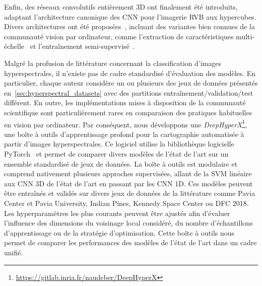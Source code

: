 Enfin, des réseaux convolutifs entièrement 3D ont finalement été introduits, adaptant l'architecture canonique des \gls{CNN} pour l'imagerie \gls{RVB} aux hypercubes. Divers architectures ont été proposées~\cite{li_spectralspatial_2017}, incluant des variantes bien connues de la communauté vision par ordinateur, comme l'extraction de caractéristiques multi-échelle~\cite{he_multi-scale_2017} et l'entraînement semi-supervisé~\cite{liu_semi-supervised_2017}.

Malgré la profusion de littérature concernant la classification d'images hyperspectrales, il n'existe pas de cadre standardisé d'évaluation des modèles. En particulier, chaque auteur considère un ou plusieurs des jeux de données présentés en~\cref{sec:hyperspectral_datasets} avec des partitions entraînement/validation/test différent. En outre, les implémentations mises à disposition de la communauté scientifique sont particulièrement rares en comparaison des pratiques habituelles en vision par ordinateur. Par conséquent, nous développons une \emph{DeepHyperX}\footnote{\url{https://gitlab.inria.fr/naudeber/DeepHyperX}}, une boîte à outils d'apprentissage profond pour la cartographie automatisée à partir d'images hyperspectrales. Ce logiciel utilise la bibliothèque logicielle \gls{PyTorch}~\cite{noauthor_pytorch_2016} et permet de comparer divers modèles de l'état de l'art sur un ensemble standardisé de jeux de données. La boîte à outils est modulaire et comprend nativement plusieurs approches supervisées, allant de la \gls{SVM} linéaire aux \gls{CNN} 3D de l'état de l'art en passant par les \gls{CNN} 1D. Ces modèles peuvent être entraînés et validés sur divers jeux de données de la littérature comme Pavia Center et Pavia University, Indian Pines, Kennedy Space Center ou \gls{DFC} 2018. Les hyperparamètres les plus courants peuvent être ajustés afin d'évaluer l'influence des dimensions du voisinage local considéré, du nombre d'échantillons d'apprentissage ou de la stratégie d'optimisation. Cette boîte à outils nous permet de comparer les performances des modèles de l'état de l'art dans un cadre unifié.


